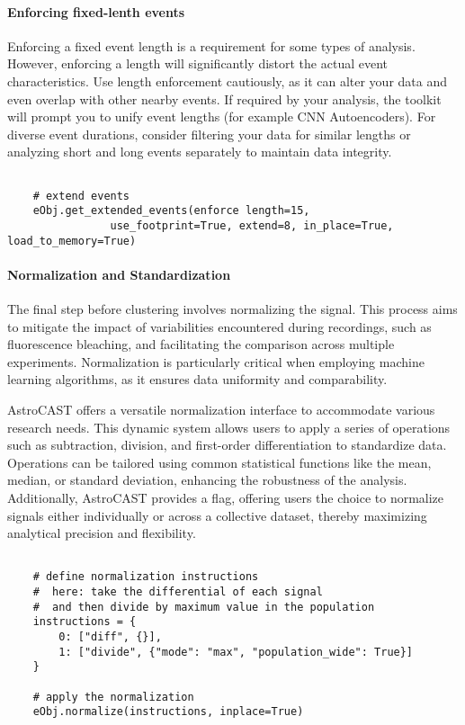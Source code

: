 \paragraph{Enforcing fixed-lenth events}
\label{par:enforcing-length}
Enforcing a fixed event length is a requirement for some types of analysis. However, enforcing a length will significantly distort the actual event characteristics. Use length enforcement cautiously, as it can alter your data and even overlap with other nearby events. If required by your analysis, the toolkit will prompt you to unify event lengths (for example \ac{CNN} Autoencoders). For diverse event durations, consider filtering your data for similar lengths or analyzing short and long events separately to maintain data integrity.

\begin{lstlisting}[style=pyStyle]

    # extend events
    eObj.get_extended_events(enforce length=15,
                use_footprint=True, extend=8, in_place=True, load_to_memory=True)

\end{lstlisting}

\paragraph{Normalization and Standardization}
The final step before clustering involves normalizing the signal. This process aims to mitigate the impact of variabilities encountered during recordings, such as fluorescence bleaching, and facilitating the comparison across multiple experiments. Normalization is particularly critical when employing machine learning algorithms, as it ensures data uniformity and comparability.

AstroCAST offers a versatile normalization interface to accommodate various research needs. This dynamic system allows users to apply a series of operations such as subtraction, division, and first-order differentiation to standardize data. Operations can be tailored using common statistical functions like the mean, median, or standard deviation, enhancing the robustness of the analysis. Additionally, AstroCAST provides a  flag, offering users the choice to normalize signals either individually or across a collective dataset, thereby maximizing analytical precision and flexibility.

\begin{lstlisting}[style=pyStyle]

    # define normalization instructions
    #  here: take the differential of each signal
    #  and then divide by maximum value in the population
    instructions = {
        0: ["diff", {}],
        1: ["divide", {"mode": "max", "population_wide": True}]
    }

    # apply the normalization
    eObj.normalize(instructions, inplace=True)

\end{lstlisting}


